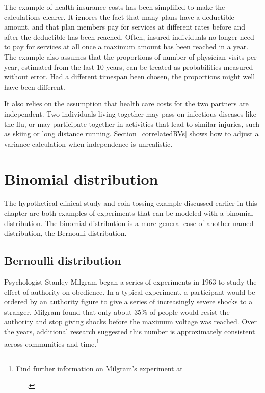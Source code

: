 The example of health insurance costs has been simplified to make the calculations clearer.  It ignores the fact that many plans have a deductible amount, and that plan members pay for services at different rates before and after the deductible has been reached. Often, insured individuals no longer need to pay for services at all once a maximum amount has been reached in a year. The example also assumes that the proportions of number of physician visits per year, estimated from the last 10 years, can be treated as probabilities measured without error. Had a different timespan been chosen, the proportions might well have been different.  

It also relies on the assumption that health care costs for the two partners are independent.  Two individuals living together may pass on infectious diseases like the flu, or may participate together in activities that lead to similar injuries, such as skiing or long distance running.  Section~\ref{correlatedRVs} shows how to adjust a variance calculation when independence is unrealistic.



\newpage

\section{Binomial distribution}
\label{binomialModel}

The hypothetical clinical study and coin tossing example discussed earlier in this chapter are both examples of experiments that can be modeled with a binomial distribution. The binomial distribution is a more general case of another named distribution, the Bernoulli distribution.


\subsection{Bernoulli distribution}
\label{bernoulli}


Psychologist Stanley Milgram began a series of experiments in 1963 to study the effect of authority on obedience. In a typical experiment, a participant would be ordered by an authority figure to give a series of increasingly severe shocks to a stranger. Milgram found that only about 35\% of people would resist the authority and stop giving shocks before the maximum voltage was reached. Over the years, additional research suggested this number is approximately consistent across communities and time.\footnote{Find further information on Milgram's experiment at \par \ \ \hspace{0.2mm}\ .}

